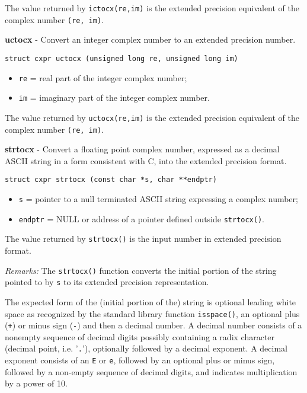 \documentclass{article}
\begin{document}
The value returned by \texttt{ictocx(re,im)} is the
extended precision equivalent of the complex number
\texttt{(re, im)}.


\hrulefill{}

\textbf{uctocx} - Convert an integer complex number to
an extended precision number.

\begin{verbatim}
struct cxpr uctocx (unsigned long re, unsigned long im)
\end{verbatim}

\begin{itemize}
\item \texttt{re} = real part of the integer complex number;
\item \texttt{im} = imaginary part of the integer complex number.
\end{itemize}

The value returned by \texttt{uctocx(re,im)} is the
extended precision equivalent of the complex number
\texttt{(re, im)}.


\hrulefill{}

\textbf{strtocx} - Convert a floating point complex number,
expressed as a decimal ASCII string
in a form consistent with C, into the extended precision format.

\begin{verbatim}
struct cxpr strtocx (const char *s, char **endptr)
\end{verbatim}

\begin{itemize}
\item \texttt{s} = pointer to a null terminated ASCII string expressing a
complex number;
\item \texttt{endptr} = NULL or address of a pointer defined
outside \texttt{strtocx()}.
\end{itemize}

The value returned by \texttt{strtocx()} is
the input number in extended precision format.

\textit{Remarks:}
The \texttt{strtocx()} function converts the initial portion of 
the string pointed to
by \texttt{s} to its extended precision representation.

The  expected  form  of  the (initial portion of the) string is optional
leading white space  as  recognized  by  the standard library function
\texttt{isspace()}, an optional plus (\texttt{+}) or minus sign (\texttt{-}) and 
then a decimal number.
A  decimal number consists of a nonempty sequence of decimal digits possibly
containing a radix character (decimal  point, i.e. '\texttt{.}'), optionally
followed by a decimal exponent.   A decimal exponent consists of an
\texttt{E} or \texttt{e}, followed by an optional plus or minus sign, followed  by
a non-empty sequence of decimal digits, and indicates multiplication by
a power of 10.
\end{document}
